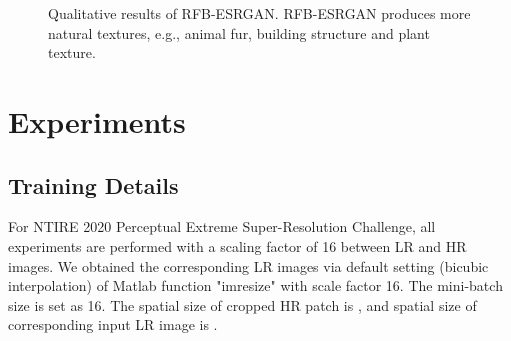 \documentclass[10pt,twocolumn,letterpaper]{article}
\begin{document}
\begin{figure*}
    \centering
    \hspace{0.005in}
    \hspace{0.005in}
    \hspace{0.005in}
    \hspace{0.005in}
     \vspace{-0.15in}
    \hspace{0.005in}
    \hspace{0.005in}
    \hspace{0.005in}
    \hspace{0.005in}
    \vspace{-0.15in}
    
    
    \caption{Qualitative results of RFB-ESRGAN. RFB-ESRGAN produces more natural textures, e.g., animal fur, building structure and plant texture.}
\label{fig:result1}
\end{figure*}

\section{Experiments}
\subsection{Training Details}
For NTIRE 2020 Perceptual Extreme Super-Resolution Challenge, all experiments are performed with a scaling factor of 16 between LR and HR images. We obtained the corresponding LR images via default setting (bicubic interpolation) of Matlab function "imresize" with scale factor 16. The mini-batch size is set as 16. The spatial size of cropped HR patch is , and spatial size of corresponding input LR image is . 
\end{document}
